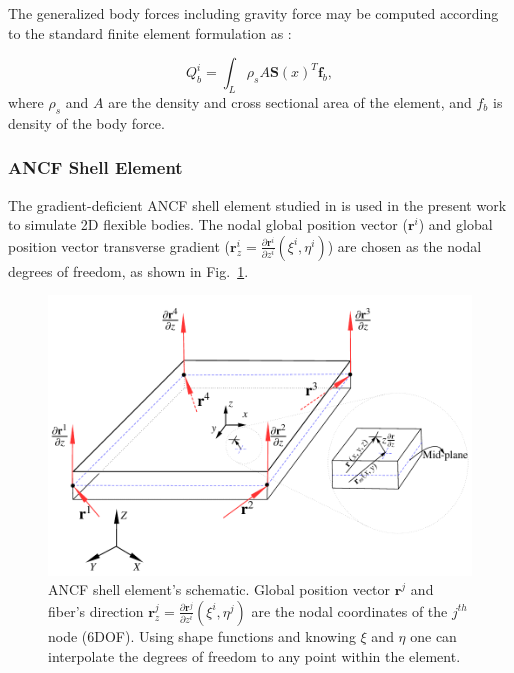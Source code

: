 The generalized body forces including gravity force may be computed according to the standard finite element formulation as :

 \begin{equation} \label{eq:ANCF_Beam_Qb}
Q^i_b = \int_{L} \rho_s A \bm S(x)^T \bm f_b,
\end{equation}
where $\rho_s$ and $A$ are the density and cross sectional area of the element, and $f_b$ is density of the body force. 


\subsubsection*{ANCF Shell Element}\label{sec:2DElem}
The gradient-deficient ANCF shell element studied in \cite{Yamashita2015continuum} is used in the present work to simulate 2D flexible bodies. The nodal global position vector ($\mathbf{r}^{i}$) and global position vector transverse gradient ($\mathbf{r}_{z}^{i}=\frac{\partial {{\mathbf{r}}^{i}}}{\partial {{z}^{i}}}({{\xi}^{i}},{{\eta}^{i}})$) are chosen as the nodal degrees of freedom, as shown in Fig.~\ref{fig:ANCF_Shells}.

\begin{figure}[!t]
	\begin{center}
				\includegraphics[width=.6\linewidth]{images/ANCF_2D.pdf}
	\end{center}
		\caption{ANCF shell element's schematic. Global position vector $\mathbf{r}^{j}$ and fiber's direction $\mathbf{r}_z^{j}=\frac{\partial {{\mathbf{r}}^{j}}}{\partial {{z}^{i}}}({{\xi}^{i}},{{\eta}^{j}})$ are the nodal coordinates of the $j^{th}$ node (6DOF). Using shape functions and knowing $\xi$ and $\eta$ one can interpolate the degrees of freedom to any point within the element. }\label{fig:ANCF_Shells}
\end{figure}

